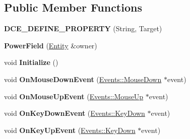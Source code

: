 \subsection*{Public Member Functions}
\begin{DoxyCompactItemize}
\item 
\hypertarget{classDCEngine_1_1Components_1_1PowerField_adc01ea8e9c97388dd96ccb861debfe30}{{\bfseries D\-C\-E\-\_\-\-D\-E\-F\-I\-N\-E\-\_\-\-P\-R\-O\-P\-E\-R\-T\-Y} (String, Target)}\label{classDCEngine_1_1Components_1_1PowerField_adc01ea8e9c97388dd96ccb861debfe30}

\item 
\hypertarget{classDCEngine_1_1Components_1_1PowerField_ab8aa6d306640435f006d4240b2c9386d}{{\bfseries Power\-Field} (\hyperlink{classDCEngine_1_1Entity}{Entity} \&owner)}\label{classDCEngine_1_1Components_1_1PowerField_ab8aa6d306640435f006d4240b2c9386d}

\item 
\hypertarget{classDCEngine_1_1Components_1_1PowerField_ac4ee7515d4348ad564f1908f5460f32c}{void {\bfseries Initialize} ()}\label{classDCEngine_1_1Components_1_1PowerField_ac4ee7515d4348ad564f1908f5460f32c}

\item 
\hypertarget{classDCEngine_1_1Components_1_1PowerField_a38b180d716fd9c34e67ccf1d8d2285e4}{void {\bfseries On\-Mouse\-Down\-Event} (\hyperlink{classDCEngine_1_1Events_1_1MouseDown}{Events\-::\-Mouse\-Down} $\ast$event)}\label{classDCEngine_1_1Components_1_1PowerField_a38b180d716fd9c34e67ccf1d8d2285e4}

\item 
\hypertarget{classDCEngine_1_1Components_1_1PowerField_ac9a3f6bafdee70c2e095ba16c2c87370}{void {\bfseries On\-Mouse\-Up\-Event} (\hyperlink{classDCEngine_1_1Events_1_1MouseUp}{Events\-::\-Mouse\-Up} $\ast$event)}\label{classDCEngine_1_1Components_1_1PowerField_ac9a3f6bafdee70c2e095ba16c2c87370}

\item 
\hypertarget{classDCEngine_1_1Components_1_1PowerField_afca8527e842fbf59597b198afb4a4aa1}{void {\bfseries On\-Key\-Down\-Event} (\hyperlink{classDCEngine_1_1Events_1_1KeyDown}{Events\-::\-Key\-Down} $\ast$event)}\label{classDCEngine_1_1Components_1_1PowerField_afca8527e842fbf59597b198afb4a4aa1}

\item 
\hypertarget{classDCEngine_1_1Components_1_1PowerField_afc5d95d9aec4b467d28fa22a95f67ae9}{void {\bfseries On\-Key\-Up\-Event} (\hyperlink{classDCEngine_1_1Events_1_1KeyDown}{Events\-::\-Key\-Down} $\ast$event)}\label{classDCEngine_1_1Components_1_1PowerField_afc5d95d9aec4b467d28fa22a95f67ae9}


\end{DoxyCompactItemize}
